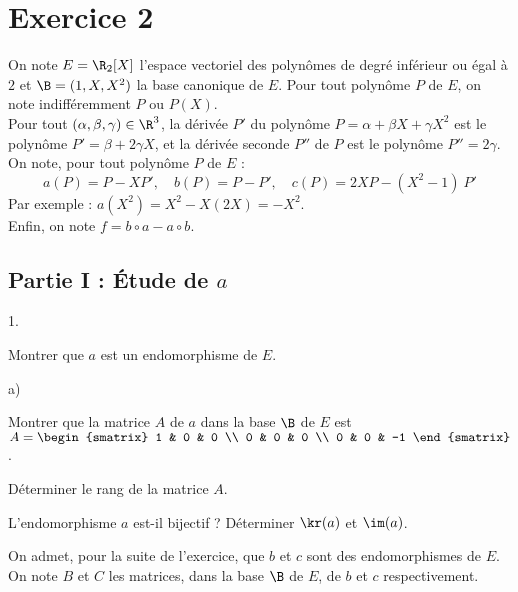 \documentclass[11pt]{article}%
\begin{document}


\section*{Exercice 2}

\noindent
On note $E = \R_2[X]$ l'espace vectoriel des polynômes de degré
inférieur ou égal à $2$ et $\B = (1,X,X^2)$ la base canonique de $E$.
Pour tout polynôme $P$ de $E$, on note indifféremment $P$ ou $P(X)$.\\
Pour tout $(\alpha,\beta,\gamma)\in\R^3$, la dérivée $P'$ du polynôme
$P=\alpha+\beta X+\gamma X^2$ est le polynôme $P' = \beta+2\gamma X$,
et la dérivée seconde $P''$ de $P$ est le polynôme $P'' = 2\gamma$.\\
On note, pour tout polynôme $P$ de $E$ :
\[
a(P) = P-XP', \quad b(P) = P-P', \quad c(P) = 2XP-(X^2-1) \ P'
\]
Par exemple : $a(X^2) = X^2-X(2X) = -X^2$.\\
Enfin, on note $f = b\circ a - a \circ b$.




\subsection*{Partie I : Étude de $a$}

\begin{noliste}{1.}
  \setlength{\itemsep}{2mm}
\item Montrer que $a$ est un endomorphisme de $E$.
  
  




\item
  \begin{noliste}{a)}
  \item Montrer que la matrice $A$ de $a$ dans la base $\B$ de $E$ est
    $A = 
    \begin{smatrix} 
      1 & 0 & 0 \\ 
      0 & 0 & 0 \\ 
      0 & 0 & -1
    \end{smatrix}$.
    
    
    
  \item Déterminer le rang de la matrice $A$.
    
    
  \end{noliste}
  
\item L'endomorphisme $a$ est-il bijectif ? Déterminer $\kr(a)$ et
  $\im(a)$.

  
  On admet, pour la suite de l'exercice, que $b$ et $c$ sont des
  endomorphismes de $E$.\\
  On note $B$ et $C$ les matrices, dans la base $\B$ de $E$, de $b$ et
  $c$ respectivement.
\end{noliste}
\end{document}
